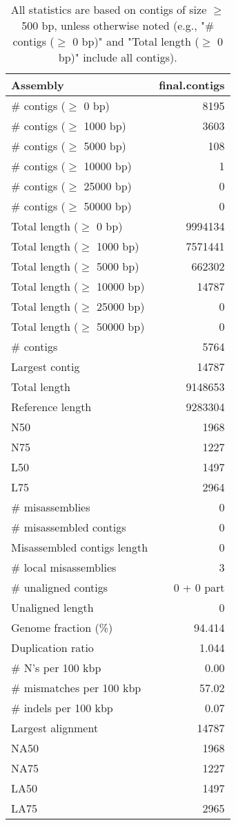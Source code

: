 \documentclass[12pt,a4paper]{article}
\begin{document}
\begin{table}[ht]
\begin{center}
\caption{All statistics are based on contigs of size $\geq$ 500 bp, unless otherwise noted (e.g., "\# contigs ($\geq$ 0 bp)" and "Total length ($\geq$ 0 bp)" include all contigs).}
\begin{tabular}{|l*{1}{|r}|}
\hline
Assembly & final.contigs \\ \hline
\# contigs ($\geq$ 0 bp) & 8195 \\ \hline
\# contigs ($\geq$ 1000 bp) & 3603 \\ \hline
\# contigs ($\geq$ 5000 bp) & 108 \\ \hline
\# contigs ($\geq$ 10000 bp) & 1 \\ \hline
\# contigs ($\geq$ 25000 bp) & 0 \\ \hline
\# contigs ($\geq$ 50000 bp) & 0 \\ \hline
Total length ($\geq$ 0 bp) & 9994134 \\ \hline
Total length ($\geq$ 1000 bp) & 7571441 \\ \hline
Total length ($\geq$ 5000 bp) & 662302 \\ \hline
Total length ($\geq$ 10000 bp) & 14787 \\ \hline
Total length ($\geq$ 25000 bp) & 0 \\ \hline
Total length ($\geq$ 50000 bp) & 0 \\ \hline
\# contigs & 5764 \\ \hline
Largest contig & 14787 \\ \hline
Total length & 9148653 \\ \hline
Reference length & 9283304 \\ \hline
N50 & 1968 \\ \hline
N75 & 1227 \\ \hline
L50 & 1497 \\ \hline
L75 & 2964 \\ \hline
\# misassemblies & 0 \\ \hline
\# misassembled contigs & 0 \\ \hline
Misassembled contigs length & 0 \\ \hline
\# local misassemblies & 3 \\ \hline
\# unaligned contigs & 0 + 0 part \\ \hline
Unaligned length & 0 \\ \hline
Genome fraction (\%) & 94.414 \\ \hline
Duplication ratio & 1.044 \\ \hline
\# N's per 100 kbp & 0.00 \\ \hline
\# mismatches per 100 kbp & 57.02 \\ \hline
\# indels per 100 kbp & 0.07 \\ \hline
Largest alignment & 14787 \\ \hline
NA50 & 1968 \\ \hline
NA75 & 1227 \\ \hline
LA50 & 1497 \\ \hline
LA75 & 2965 \\ \hline
\end{tabular}
\end{center}
\end{table}
\end{document}
